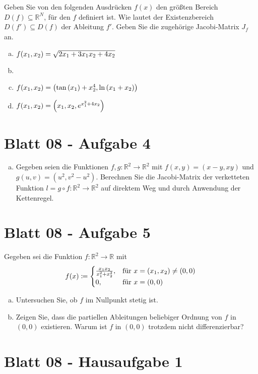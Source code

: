 \documentclass{scrreprt}
\begin{document}
Geben Sie von den folgenden Ausdrücken $f(x)$ den größten Bereich
$D(f) \subseteq \mathbb{R}^N$, für den $f$ definiert ist.
Wie lautet der Existenzbereich $D(f') \subseteq D(f)$ der Ableitung $f'$.
Geben Sie die zugehörige Jacobi-Matrix $J_f$ an.
\begin{enumerate}[a)]
\item $f\qty(x_1, x_2) = \sqrt{2x_1 + 3x_1x_2 + 4x_2}$
\item
\item $f\qty(x_1, x_2) = \qty(\tan\qty(x_1) + x_2^4, \ln\qty(x_1 + x_2))$
\item $f\qty(x_1, x_2) = \qty(x_1, x_2, e^{x_1^2 + 4 x_2})$
\end{enumerate}

\section{Blatt 08 - Aufgabe 4}

\begin{enumerate}[a)]
\item Gegeben seien die Funktionen
  $f, g \colon \mathbb{R}^2 \to \mathbb{R}^2$ mit
  $f(x, y) = (x - y, xy)$ und $g(u, v) = (u^2, v^2 - u^2)$.
  Berechnen Sie die Jacobi-Matrix der verketteten Funktion
  $l = g \circ f \colon \mathbb{R}^2 \to \mathbb{R}^2$
  auf direktem Weg und durch Anwendung der Kettenregel.
\end{enumerate}

\section{Blatt 08 - Aufgabe 5}
Gegeben sei die Funktion
$f \colon \mathbb{R}^2 \to \mathbb{R}$ mit
\[
  f(x) \coloneqq \begin{cases}
    \frac{x_1x_2}{x_1^2 + x_2^2}, & \text{für } x = \qty(x_1, x_2) \ne (0, 0) \\
    0, & \text{für } x = (0, 0)
  \end{cases}
\]

\begin{enumerate}[a)]
\item Untersuchen Sie, ob $f$ im Nullpunkt stetig ist.
\setcounter{enumi}{2}
\item Zeigen Sie, dass die partiellen Ableitungen beliebiger Ordnung von
  $f$ in $(0, 0)$ existieren.
  Warum ist $f$ in $(0, 0)$ trotzdem nicht differenzierbar?
\end{enumerate}

\section{Blatt 08 - Hausaufgabe 1}
\end{document}
